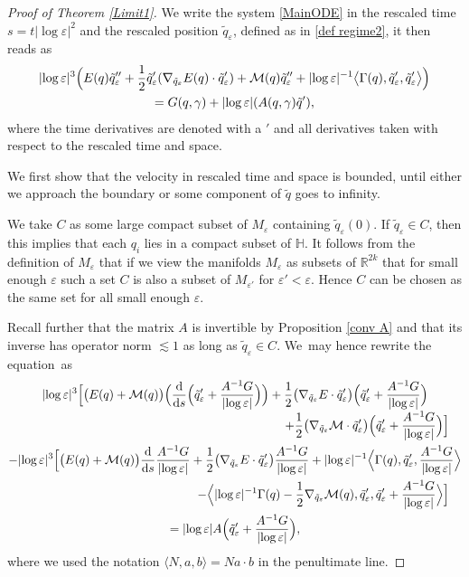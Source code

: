 \documentclass[10pt]{amsart}
\let\epsilon\varepsilon
\theoremstyle{definition}
\newcommand\R{\mathbb{R}}
\newcommand\eq{=}
\let\eps\epsilon
\begin{document}
\begin{proof}[Proof of Theorem \ref{Limit1}]
We write the system \eqref{MainODE} in the rescaled time $s=t|{\log\eps}|^2$ and the rescaled position $\tilde{q}_\eps$, defined as in \eqref{def regime2}, it then reads as
\begin{multline}\label{rescaled ODE}
|{\log\eps}|^3\Bigl(E(q)\tilde{q}_{\eps}''+\frac{1}{2}\tilde{q}_{\eps}'(\nabla_{\tilde{q}_\eps}E(q)\cdot\tilde{q}_{\eps}')+\mathcal{M}(q)\tilde{q}_\eps''+|{\log\eps}|^{-1}\bigl\langle\Gamma(q),\tilde{q}_{\eps}',\tilde{q}_{\eps}'\bigr\rangle \Bigr)\\
\eq G(q,\gamma)+|{\log\eps}|(A(q,\gamma)\tilde{q}'),
\end{multline}
where the time derivatives are denoted with a $'$ and all derivatives taken with respect to the rescaled time and space.

We first show that the velocity in rescaled time and space is bounded, until either we approach the boundary or some component of $\tilde{q}$ goes to infinity.

We take $C$ as some large compact subset of $M_\eps$ containing $\tilde{q}_\eps(0)$.
If $\tilde{q}_\eps\in C$, then this implies that each $q_i$ lies in a compact subset of $\mathbb{H}$. It follows from the definition of $M_\eps$ that if we view the manifolds $M_\eps$ as subsets of $\R^{2k}$ that for small enough $\eps$ such a set $C$ is also a subset of $M_{\eps'}$ for $\eps'<\eps$. Hence $C$ can be chosen as the same set for all small enough $\eps$.

Recall further that the matrix $A$ is invertible by Proposition \ref{conv A} and that its inverse has operator norm $\lesssim 1$ as long as $\tilde{q}_\eps\in C$. We~may hence rewrite the equation~as\vspace*{-5pt}
\begin{multline*}
|{\log\eps}|^3 \Bigr[\bigl(E(q)+\mathcal{M}(q)\bigr)\Bigl(\frac{\text{d}}{\text{d}s}\Bigl(\tilde{q}_\eps'+\frac{A^{-1}G}{|{\log\eps}|}\Bigr)\Bigr)+\frac{1}{2}\bigl(\nabla_{\tilde{q}_\eps}E\cdot\tilde{q}_\eps'\bigr)\Bigl(\tilde{q}_\eps'+\frac{A^{-1}G}{|{\log\eps}|}\Bigr)\\[-3pt]
\shoveright{+\frac{1}{2}\bigl(\nabla_{\tilde{q}_\eps}\mathcal{M}\cdot\tilde{q}_\eps'\bigr)\Bigl(\tilde{q}_\eps'+\frac{A^{-1}G}{|{\log\eps}|}\Bigr) \Bigr]}\\
-|{\log\eps}|^3 \Bigl[\bigl(E(q)+\mathcal{M}(q)\bigr)\frac{\text{d}}{\text{d}s}\frac{A^{-1}G}{|{\log\eps}|}+\frac{1}{2}\bigl(\nabla_{\tilde{q}_\eps}E\cdot\tilde{q}_\eps'\bigr)\frac{A^{-1}G}{|{\log\eps}|}+|{\log\eps}|^{-1}\Bigl\langle \Gamma(q),\tilde{q}_\eps',\frac{A^{-1}G}{|{\log\eps}|}\Bigr\rangle\\
\shoveright{-\Bigl\langle |{\log\eps}|^{-1}\Gamma(q)-\frac{1}{2}\nabla_{\tilde{q}_\eps}\mathcal{M}(q),\tilde{q}_\eps',\tilde{q}_\eps'+\frac{A^{-1}G}{|{\log\eps}|}\Bigr\rangle \Bigr]}\\
=|{\log\eps}|A\Bigl(\tilde{q}_\eps'+\frac{A^{-1}G}{|{\log\eps}|}\Bigr),
\end{multline*}
where we used the notation $\langle N,a,b\rangle=Na\cdot b$ in the penultimate line.


\end{proof}
\end{document}

